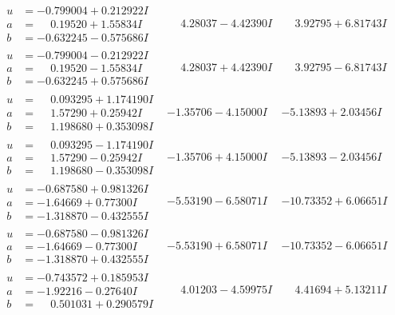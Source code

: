 \documentclass[1p]{elsarticle_modified}
\theoremstyle{definition}
\begin{document}
$$\begin{array}{c|c|c}
\begin{aligned}
u &= -0.799004 + 0.212922 I \\
a &= \phantom{-}0.19520 + 1.55834 I \\
b &= -0.632245 - 0.575686 I\end{aligned}
 & \phantom{-}4.28037 - 4.42390 I & \phantom{-}3.92795 + 6.81743 I \\ \hline\begin{aligned}
u &= -0.799004 - 0.212922 I \\
a &= \phantom{-}0.19520 - 1.55834 I \\
b &= -0.632245 + 0.575686 I\end{aligned}
 & \phantom{-}4.28037 + 4.42390 I & \phantom{-}3.92795 - 6.81743 I \\ \hline\begin{aligned}
u &= \phantom{-}0.093295 + 1.174190 I \\
a &= \phantom{-}1.57290 + 0.25942 I \\
b &= \phantom{-}1.198680 + 0.353098 I\end{aligned}
 & -1.35706 - 4.15000 I & -5.13893 + 2.03456 I \\ \hline\begin{aligned}
u &= \phantom{-}0.093295 - 1.174190 I \\
a &= \phantom{-}1.57290 - 0.25942 I \\
b &= \phantom{-}1.198680 - 0.353098 I\end{aligned}
 & -1.35706 + 4.15000 I & -5.13893 - 2.03456 I \\ \hline\begin{aligned}
u &= -0.687580 + 0.981326 I \\
a &= -1.64669 + 0.77300 I \\
b &= -1.318870 - 0.432555 I\end{aligned}
 & -5.53190 - 6.58071 I & -10.73352 + 6.06651 I \\ \hline\begin{aligned}
u &= -0.687580 - 0.981326 I \\
a &= -1.64669 - 0.77300 I \\
b &= -1.318870 + 0.432555 I\end{aligned}
 & -5.53190 + 6.58071 I & -10.73352 - 6.06651 I \\ \hline\begin{aligned}
u &= -0.743572 + 0.185953 I \\
a &= -1.92216 - 0.27640 I \\
b &= \phantom{-}0.501031 + 0.290579 I\end{aligned}
 & \phantom{-}4.01203 - 4.59975 I & \phantom{-}4.41694 + 5.13211 I \\ \hline\begin{aligned}

\end{aligned}
\end{array}$$
\end{document}
